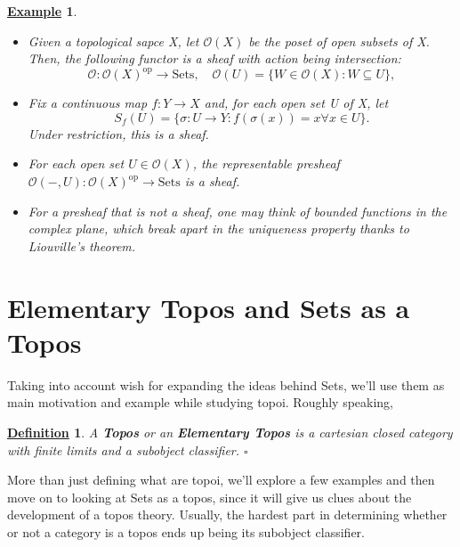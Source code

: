 \documentclass{article}
\newtheorem*{def*}{\underline{Definition}}
\newtheorem{example}{\underline{Example}}
\begin{document}
\begin{example}
	\begin{itemize}
		\item[1)] Given a topological sapce X, let \(\mathcal{O}(X)\) be the poset of open subsets of X. Then, the following functor is a sheaf with action being intersection:
		      \[
			      \mathcal{O}:\mathcal{O}(X)^{\mathrm{op}}\rightarrow \mathrm{Sets},\quad \mathcal{O}(U) = \{W\in \mathcal{O}(X): W\subseteq U\},
		      \]
		\item[2)] Fix a continuous map \(f:Y\rightarrow X\) and, for each open set U of X, let
		      \[
			      S_{f}(U)=\{\sigma:U\rightarrow Y: f(\sigma(x))=x \forall x\in U\}.
		      \]
		      Under restriction, this is a sheaf.
		\item[3)] For each open set \(U\in \mathcal{O}(X)\), the representable presheaf \(\mathcal{O}(-, U):\mathcal{O}(X)^{\mathrm{op}}\rightarrow \mathrm{Sets}\) is a sheaf.
		\item[4)] For a presheaf that is not a sheaf, one may think of bounded functions in the complex plane, which break apart in the uniqueness property thanks to Liouville's theorem.
	\end{itemize}
\end{example}

\section{Elementary Topos and Sets as a Topos}

Taking into account wish for expanding the ideas behind Sets, we'll use them as main motivation and example while studying topoi. Roughly speaking,

\begin{def*}
	A \textbf{Topos} or an \textbf{Elementary Topos} is a cartesian closed category with finite limits and a subobject classifier. \(\square\)
\end{def*}

More than just defining what are topoi, we'll explore a few examples and then move on to looking at Sets as a topos, since it will give us clues about the development of a topos theory. Usually, the hardest part in determining whether or not a category is a topos ends up being its subobject classifier.
\end{document}

